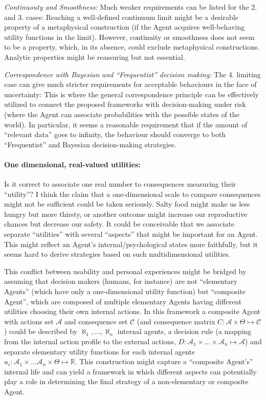 \documentclass{article}
\begin{document}
{\it Continuouty and Smoothness:}
Much weaker requirements can be listed for the 2. and 3. cases:
Reaching a well-defined continuum limit might be a desirable property of a metaphysical construction (if the Agent acquires well-behaving utility functions in the limit).
However, continuity or smoothness does not seem to be a property, which, in its absence, could exclude metaphysical constructions.
Analytic properties might be reassuring but not essential.

{\it Correspondence with Bayesian and ``Frequentist'' decision making:}
The 4. limiting case can give much stricter requirements for acceptable behaviours in the face of uncertainty:
This is where the general correspondence principle can be effectively utilized to connect the proposed frameworks with decision-making under risk (where the Agent can associate probabilities with the possible states of the world).
In particular, it seems a reasonable requirement that if the amount of ``relevant data'' goes to infinity, the behaviour should converge to both ``Frequentist'' and Bayesian decision-making strategies.

\paragraph{One dimensional, real-valued utilities:}
Is it correct to associate one real number to consequences measuring their ``utility''?
I think the claim that a one-dimensional scale to compare consequences might not be sufficient could be taken seriously. Salty food might make us less hungry but more thirsty, or another outcome might increase our reproductive chances but decrease our safety. It could be conceivable that we associate separate ``utilities'' with several ``aspects'' that might be important for an Agent.
This might reflect an Agent’s internal/psychological states more faithfully, but it seems hard to derive strategies based on such multidimensional utilities.

This conflict between usability and personal experiences might be bridged by assuming that decision makers (humans, for instance) are not ``elementary Agents'' (which have only a one-dimensional utility function) but ``composite Agent'', which are composed of multiple elementary Agents having different utilities choosing their own internal actions.
In this framework a composite Agent with actions set $\mathcal{A}$ and consequence set $\mathcal{C}$ (and consequence matrix $C:\mathcal{A} \times \Theta \mapsto \mathcal{C}$) could be described by 
$\aleph_1,\dots,\aleph_n$ internal agents, a decision rule (a mapping from the internal action profile to the external actions, $D:\mathcal{A}_1 \times \dots \times \mathcal{A}_n \mapsto \mathcal{A}$) and separate elementary utility functions for each internal agents $u_i: \mathcal{A}_1 \times \dots \mathcal{A}_n \times \Theta \mapsto \mathbb{R}$.
This construction might capture a “composite Agent's” internal life and can yield a framework in which different aspects can potentially play a role in determining the final strategy of a non-elementary or composite Agent.
\end{document}
